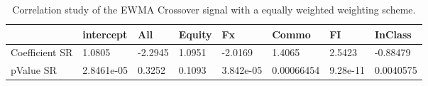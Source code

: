 \begin{table}[H]
\centering
\begin{tabular}{llllllll}
& intercept & All & Equity & Fx & Commo & FI & InClass \\ 
\hline 
Coefficient SR & 1.0805 & -2.2945 & 1.0951 & -2.0169 & 1.4065 & 2.5423 & -0.88479 \\ 
pValue SR & 2.8461e-05 & 0.3252 & 0.1093 & 3.842e-05 & 0.00066454 & 9.28e-11 & 0.0040575 \\ 
\hline
\end{tabular}
\caption{Correlation study of the EWMA Crossover signal with a equally weighted weighting scheme.}
\label{MBBS_EW_CORR}
\end{table}